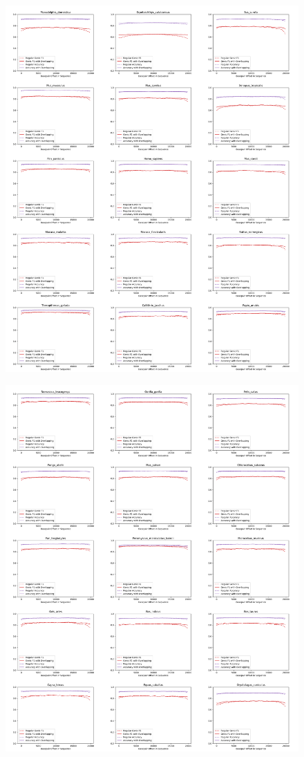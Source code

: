 \documentclass{article}
\begin{document}
\begin{figure}[!h]
\centerline{\includegraphics[width=1.2\textwidth]{images/overlapping/montage_animals1}}
\end{figure}
\begin{figure}[!h]
\centerline{\includegraphics[width=1.2\textwidth]{images/overlapping/montage_animals2}}
\end{figure}
\end{document}
